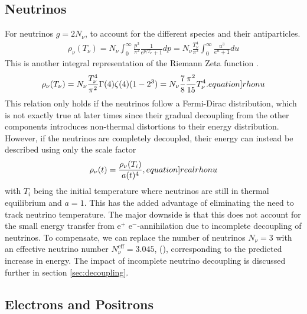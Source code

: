 \subsection{Neutrinos}
\label{sec:rhoNeutrino}
For neutrinos $g=2N_\nu$, to account for the different species and their antiparticles.
\begin{align}
    \rho_\nu(T_\nu)=N_\nu\int_{0}^{\infty} \frac{p^3}{\pi^2}\frac{1}{e^{p/T_\nu}+1}dp =  N_\nu\frac{T_\nu^4}{\pi^2}\int_{0}^{\infty}\frac{u^3}{e^{u}+1}du
\end{align}
This is another integral representation of the Riemann Zeta function \cite[\href{https://dlmf.nist.gov/25.5.E3}{(25.5.3)}]{NIST:DLMF}.
\begin{align}
    \rho_\nu(T_\nu)=N_\nu\frac{T_\nu^4}{\pi^2}\Gamma(4)\zeta(4)(1-2^3)=N_\nu\frac{7}{8}\frac{\pi^2}{15}T_\nu^4.
    \label[equation]{rhonu}
\end{align}
This relation only holds if the neutrinos follow a Fermi-Dirac distribution, which is not exactly true at later times since their gradual decoupling from the other components introduces non-thermal distortions to their energy distribution. However, if the neutrinos are completely decoupled, their energy can instead be described using only the scale factor 
\begin{align}
    \rho_\nu(t)=\frac{\rho_\nu(T_i)}{a(t)^4},
    \label[equation]{realrhonu}
\end{align}
with $T_i$ being the initial temperature where neutrinos are still in thermal equilibrium and $a=1$. This has the added advantage of eliminating the need to track neutrino temperature. The major downside is that this does not account for the small energy transfer from e${^+}$ e${^-}$-annihilation due to incomplete decoupling of neutrinos. To compensate, we can replace the number of neutrinos $N_\nu=3$ with an effective neutrino number $N_\nu^\text{eff}=3.045$, (\textcite{de_Salas_2016}), corresponding to the predicted increase in energy. The impact of incomplete neutrino decoupling is discussed further in section \ref{sec:decoupling}.




\subsection{Electrons and Positrons}


